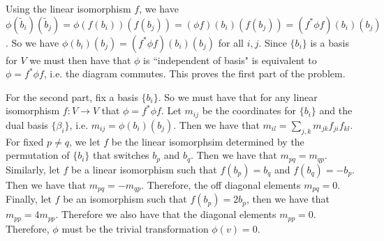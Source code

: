 Using the linear isomorphism \(f\), we have \(\phi(\tilde b_i)(\tilde b_j) = \phi(f(b_i))(f(b_j)) = (\phi f)(b_i)(f(b_j)) = (f^* \phi f)(b_i)(b_j)\). So we have \(\phi(b_i)(b_j) = (f^*\phi f)(b_i)(b_j)\)
for all \(i, j\). Since \(\{b_i\}\) is a basis for \(V\) we must then have that \(\phi\) is ``independent of basis" is equivalent to \(\phi = f^* \phi f\), i.e. the diagram commutes. This proves the
first part of the problem.

For the second part, fix a basis \(\{b_i\}\). So we must have that for any linear isomorphism \(f: V \to V\) that \(\phi = f^* \phi f\). Let \(m_{ij}\) be the coordinates for \(\{b_i\}\) and the dual
basis \(\{\beta_i\}\), i.e. \(m_{ij} = \phi(b_i)(b_j)\). Then we have that \(m_{il} = \sum_{j, k} m_{jk}f_{ji}f_{kl}\). For fixed \(p \neq q\), we let \(f\) be the linear isomorphsim determined by
the permutation of \(\{b_i\}\) that switches \(b_p\) and \(b_q\). Then we have that \(m_{pq} = m_{qp}\). Similarly, let \(f\) be a linear isomorphism such that \(f(b_p) = b_q\) and \(f(b_q) = -b_p\).
Then we have that \(m_{pq} = -m_{qp}\). Therefore, the off diagonal elements \(m_{pq} = 0\). Finally, let \(f\) be an isomorphism such that \(f(b_p) = 2b_p\), then we have that
\(m_{pp} = 4 m_{pp} \). Therefore we also have that the diagonal elements \(m_{pp} = 0\). Therefore, \(\phi\) must be the trivial transformation \(\phi(v) = 0\). 

